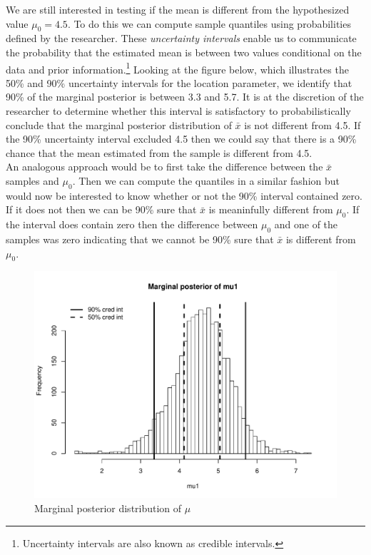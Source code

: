 \documentclass[12pt]{article}
\begin{document}
\noindent We are still interested in testing if the mean is different from the hypothesized value $\mu_0 = 4.5$. To do this we can compute sample quantiles using probabilities defined by the researcher. These \emph{uncertainty intervals} enable us to communicate the probability that the estimated mean is between two values conditional on the data and prior information.\footnote{Uncertainty intervals are also known as credible intervals.} Looking at the figure below, which illustrates the 50\% and 90\% uncertainty intervals for the location parameter, we identify that 90\% of the marginal posterior is between 3.3 and 5.7. It is at the discretion of the researcher to determine whether this interval is satisfactory to probabilistically conclude that the marginal posterior distribution of $\bar{x}$ is not different from 4.5. If the 90\% uncertainty interval excluded 4.5 then we could say that there is a 90\% chance that the mean estimated from the sample is different from 4.5. \\

\noindent An analogous approach would be to first take the difference between the $\bar{x}$ samples and $\mu_0$. Then we can compute the quantiles in a similar fashion but would now be interested to know whether or not the 90\% interval contained zero. If it does not then we can be 90\% sure that $\bar{x}$ is meaninfully different from $\mu_0$. If the interval does contain zero then the difference between $\mu_0$ and one of the samples was zero indicating that we cannot be 90\% sure that $\bar{x}$ is different from $\mu_0$.

\begin{figure}[H]\caption[]{Marginal posterior distribution of $\mu$}
\centering
\begin{minipage}{0.6\linewidth}
\includegraphics[trim={0cm 0cm 0cm 1.5cm}, clip, scale=0.6]{../figs/norm1.pdf}
\end{minipage}
\end{figure}
\end{document}
